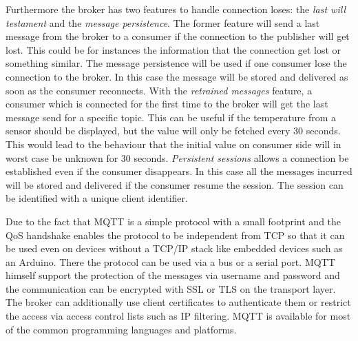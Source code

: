 Furthermore the broker has two features to handle connection loses: the \textit{last will testament} and the \textit{message persistence}.
The former feature will send a last message from the broker to a consumer if the connection to the publisher will get lost.
This could be for instances the information that the connection get lost or something similar.
The message persistence will be used if one consumer lose the connection to the broker.
In this case the message will be stored and delivered as soon as the consumer reconnects.
With the \textit{retrained messages} feature, a consumer which is connected for the first time to the broker will get the last message send for a specific topic. This can be useful if the temperature from a sensor should be displayed, but the value will only be fetched every 30 seconds. This would lead to the behaviour that the initial value on consumer side will in worst case be unknown for 30 seconds.
\textit{Persistent sessions} allows a connection be established even if the consumer disappears. In this case all the messages incurred will be stored and delivered if the consumer resume the session. The session can be identified with a unique client identifier.\autocite[cf.]{Bayer:MQTT}

Due to the fact that \ac{MQTT} is a simple protocol with a small footprint and the \ac{QoS} handshake enables the protocol to be independent from \acs{TCP} so that it can be used even on devices without a TCP/IP stack like embedded devices such as an Arduino.\autocite[cf.]{Bayer:MQTT}
There the protocol can be used via a bus or a serial port.\autocite[cf.]{Bayer:MQTT}
\ac{MQTT} himself support the protection of the messages via username and password and the communication can be encrypted with \acs{SSL} or \acs{TLS} on the transport layer.\autocite[cf.]{Bayer:MQTT}
The broker can additionally use client certificates to authenticate them or restrict the access via access control lists such as \acs{IP} filtering.\autocite[cf.]{Bayer:MQTT}
\ac{MQTT} is available for most of the common programming languages and platforms.


